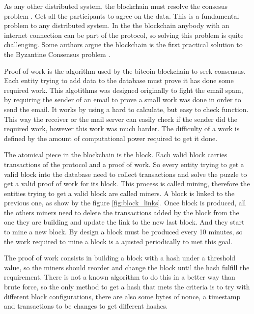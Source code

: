 As any other distributed system, the blockchain must resolve the consesus
  problem \cite{fischer1983consensus}. Get all the participants to agree on
  the data. This is a fundamental problem to any distributed system. In the
  the blockchain anybody with an internet connection can be part of the
  protocol, so solving this problem is quite challenging. Some authors argue
  the blockchain is the first practical solution to the Byzantine Consensus
  problem \cite{miller2014anonymous} \cite{sun2014solving}.

Proof of work is the algorithm used by the bitcoin blockchain to seek
  consensus. Each entity trying to add data to the database must prove it
  has done some required work. This algotithms was designed originally to
  fight the email spam, by requiring the sender of an email to prove a small
  work was done in order to send the email\cite{dwork1992pricing}.
It works by using a hard to calculate, but easy to check function. This
  way the receiver or the mail server can easily check if the sender did
  the required work, however this work was much harder. The difficulty of
  a work is defined by the amount of computational power required to get
  it done.

The atomical piece in the blockchain is the block. Each valid block carries
  transactions of the protocol and a proof of work. So every entity trying to
  get a valid block into the database need to collect transactions and solve
  the puzzle to get a valid proof of work for its block.
This process is called mining, therefore the entities trying to get a valid
  block are called miners. A block is linked to the previous one, as show by the
  figure \ref{fig:block_links}.
Once block is produced, all the others miners need to delete the transactions
  added by the block from the one they are building and update the link to the
  new last block. And they start to mine a new block.
By design a block must be produced every 10 minutes, so the work required to
  mine a block is a ajusted periodically to met this goal.

The proof of work consists in building a block with a hash under a threshold
  value, so the miners should reorder and change the block until the hash
  fulfill the requirement. There is not a known algorithm to do this in a
  better way than brute force, so the only method to get a hash that mets the
  criteria is to try with different block configurations, there are also some
  bytes of nonce, a timestamp and transactions to be changes to get different
  hashes.

